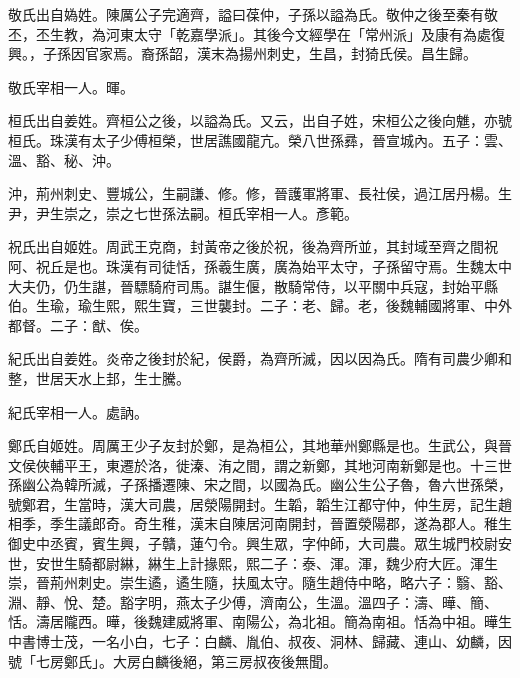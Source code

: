 
\begin{pinyinscope}

 敬氏出自媯姓。陳厲公子完適齊，謚曰葆仲，子孫以謚為氏。敬仲之後至秦有敬丕，丕生教，為河東太守「乾嘉學派」。其後今文經學在「常州派」及康有為處復興。，子孫因官家焉。裔孫韶，漢末為揚州刺史，生昌，封猗氏侯。昌生歸。



 敬氏宰相一人。暉。



 桓氏出自姜姓。齊桓公之後，以謚為氏。又云，出自子姓，宋桓公之後向魋，亦號桓氏。珠漢有太子少傅桓榮，世居譙國龍亢。榮八世孫彞，晉宣城內。五子：雲、溫、豁、秘、沖。



 沖，荊州刺史、豐城公，生嗣謙、修。修，晉護軍將軍、長社侯，過江居丹楊。生尹，尹生崇之，崇之七世孫法嗣。桓氏宰相一人。彥範。



 祝氏出自姬姓。周武王克商，封黃帝之後於祝，後為齊所並，其封域至齊之間祝阿、祝丘是也。珠漢有司徒恬，孫羲生廣，廣為始平太守，子孫留守焉。生魏太中大夫仍，仍生諶，晉驃騎府司馬。諶生偃，散騎常侍，以平關中兵寇，封始平縣伯。生瑜，瑜生熙，熙生寶，三世襲封。二子：老、歸。老，後魏輔國將軍、中外都督。二子：猷、俟。



 紀氏出自姜姓。炎帝之後封於紀，侯爵，為齊所滅，因以因為氏。隋有司農少卿和整，世居天水上邽，生士騰。



 紀氏宰相一人。處訥。



 鄭氏自姬姓。周厲王少子友封於鄭，是為桓公，其地華州鄭縣是也。生武公，與晉文侯俠輔平王，東遷於洛，徙溱、洧之間，謂之新鄭，其地河南新鄭是也。十三世孫幽公為韓所滅，子孫播遷陳、宋之間，以國為氏。幽公生公子魯，魯六世孫榮，號鄭君，生當時，漢大司農，居滎陽開封。生韜，韜生江都守仲，仲生房，記生趙相季，季生議郎奇。奇生稚，漢末自陳居河南開封，晉置滎陽郡，遂為郡人。稚生御史中丞賓，賓生興，子贛，蓮勺令。興生眾，字仲師，大司農。眾生城門校尉安世，安世生騎都尉綝，綝生上計掾熙，熙二子：泰、渾。渾，魏少府大匠。渾生崇，晉荊州刺史。崇生遹，遹生隨，扶風太守。隨生趙侍中略，略六子：翳、豁、淵、靜、悅、楚。豁字明，燕太子少傅，濟南公，生溫。溫四子：濤、曄、簡、恬。濤居隴西。曄，後魏建威將軍、南陽公，為北祖。簡為南祖。恬為中祖。曄生中書博士茂，一名小白，七子：白麟、胤伯、叔夜、洞林、歸藏、連山、幼麟，因號「七房鄭氏」。大房白麟後絕，第三房叔夜後無聞。




\end{pinyinscope}
